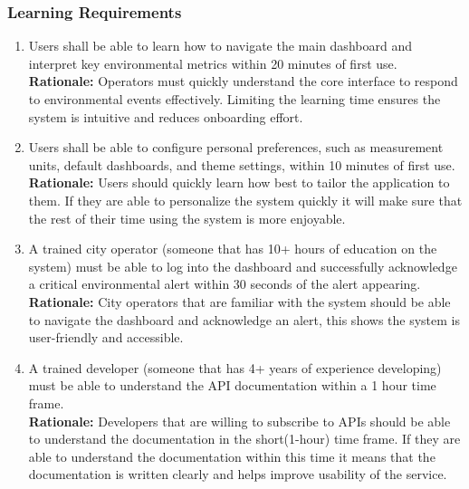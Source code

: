 \documentclass[]{article}
\begin{document}
\subsubsection{Learning Requirements}
\label{ssub:learning_requirements}
\begin{enumerate}[{UH-L}1. ]
	\item Users shall be able to learn how to navigate the main dashboard and interpret key environmental metrics within 20 minutes of first use.\\
	\textbf{Rationale:} Operators must quickly understand the core interface to respond to environmental events effectively. Limiting the learning time ensures the system is intuitive and reduces onboarding effort. \textcolor{red}{\cite{UHL1}}
	\item Users shall be able to configure personal preferences, such as measurement units, default dashboards, and theme settings, within 10 minutes of first use.\\
	\textbf{Rationale:} Users should quickly learn how best to tailor the application to them. If they are able to personalize the system quickly it will make sure that the rest of their time using the system is more enjoyable. \textcolor{red}{\cite{UHL2}}
    \item A trained city operator (someone that has 10+ hours of education on the system) must be able to log into the dashboard and successfully acknowledge a critical environmental alert within 30 seconds of the alert appearing.\\
	\textbf{Rationale:} City operators that are familiar with the system should be able to navigate the dashboard and acknowledge an alert, this shows the system is user-friendly and accessible. \textcolor{red}{\cite{UHL3}}
    \item A trained developer (someone that has 4+ years of experience developing) must be able to understand the API documentation within a 1 hour time frame.\\
	\textbf{Rationale:} Developers that are willing to subscribe to APIs should be able to understand the documentation in the short(1-hour) time frame. If they are able to understand the documentation within this time it means that the documentation is written clearly and helps improve usability of the service. \textcolor{red}{\cite{UHL4}}

\end{enumerate}
\end{document}
